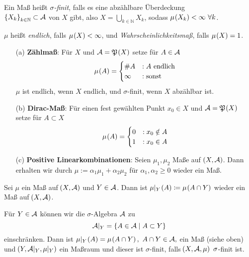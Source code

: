 \documentclass[skript.tex]{subfiles}
\begin{document}
	\begin{defin}
		Ein Maß heißt \textit{$\sigma$-finit}, falls es eine abzählbare Überdeckung \\ $\left\{X_k\right\}_{k\in\mathbb{N}} \subset \mathcal{A}$ von $X$ gibt, also $X=\bigcup_{k\in\mathbb{N}} X_k$, sodass $\mu\pr{X_k} < \infty\ \forall k$.
		
		$\mu$ heißt \textit{endlich}, falls $\mu\pr{X}<\infty$, und \textit{Wahrscheinlichkeitsmaß}, falls $\mu\pr{X}=1$.
	\end{defin}

	\begin{bsp}
		\hfill
		\begin{itemize}
			\item[(a)] \textbf{Zählmaß}: Für $X$ und $\mc{A}=\mf{P}\pr{X}$ setze für $A \in \mathcal{A}$
				\begin{equation*}
					\mu\pr{A} = 
					\begin{cases}
						\#A &: A \text{ endlich}\\
						\infty &: \text{sonst}
					\end{cases}
				\end{equation*}
				$\mu$ ist endlich, wenn $X$ endlich, und $\sigma$-finit, wenn $X$ abzählbar ist.
				
			\item[(b)] \textbf{Dirac-Maß}: Für einen fest gewählten Punkt $x_0 \in X$ und $\mc{A}=\mf{P}\pr{X}$ setze für $A \subset X$
				\begin{equation*}
					\mu\pr{A} = 
						\begin{cases}
							0 &: x_0 \notin A\\
							1 &: x_0 \in A
						\end{cases}
				\end{equation*}
			
			\item[(c)] \textbf{Positive Linearkombinationen}: Seien $\mu_1, \mu_2$ Maße auf $\pr{X, \mc{A}}$. Dann erhalten wir durch $\mu:= \alpha_1\mu_1 + \alpha_2\mu_2$ für $\alpha_1, \alpha_2 \geq 0$ wieder ein Maß. 
		\end{itemize} 
	\end{bsp}

	\begin{bsp}
		Sei $\mu$ ein Maß auf $\pr{X,\mc{A}}$ und $Y\in\mathcal{A}$. Dann ist $\mu|_{Y}\pr{A} \coloneqq \mu\pr{A\cap Y}$ wieder ein Maß auf $\pr{X, \mc{A}}$. 
	\end{bsp}
	
	\begin{bem*}
		Für $Y \in \mathcal{A}$ können wir die $\sigma$-Algebra $\mathcal{A}$ zu 
		\begin{equation*}
			\mathcal{A}|_{Y} = \left\{A \in \mathcal{A} \mid A \subset Y\right\}
		\end{equation*}
		einschränken. Dann ist $\mu|_Y\pr{A} = \mu\pr{A\cap Y},\ A\cap Y \in \mc{A},$ ein Maß (siehe oben) und $\pr{Y,\mc{A}|_Y,\mu|_Y}$ ein Maßraum und dieser ist $\sigma$-finit, falls $\pr{X,\mc{A},\mu}\ \sigma$-finit ist. 
	\end{bem*}
	
\end{document}
